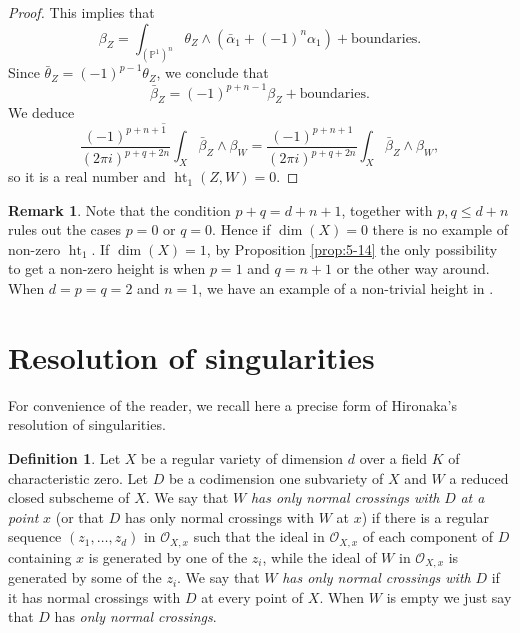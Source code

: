 \documentclass[11pt,a4paper]{amsart}
\renewcommand{\P}{\mathds{P}}
\newcommand{\caO}{\mathcal{O}}
\DeclareMathOperator{\Ht}{ht}
\numberwithin{equation}{section}
\theoremstyle{plain}
\theoremstyle{definition}
\newtheorem{df}[prop]{Definition}
\newtheorem{rmk}[prop]{Remark}
\begin{document}
\begin{proof}
This implies that 
\begin{displaymath}
  \beta_{Z}=\int_{ (\P^{1})^{n}}\theta _{Z}
  \wedge (\bar \alpha _{1}+(-1)^{n}\alpha _{1})+\text{boundaries}.
\end{displaymath}
Since $\bar \theta _{Z}=(-1)^{p-1}\theta _{Z}$, we conclude that
\begin{displaymath}
  \bar \beta _{Z}=(-1)^{p+n-1}\beta _{Z}+\text{boundaries}.
\end{displaymath}
 We deduce
\begin{displaymath}
  \overline {\frac{(-1)^{p+n+1}}{(2\pi i)^{p+q+2n}}
    \int_{X} \bar \beta _{Z}\wedge \beta _{W}}=
  \frac{(-1)^{p+n+1}}{(2\pi i)^{p+q+2n}}
    \int_{X} \bar \beta _{Z}\wedge \beta _{W},
  \end{displaymath}
  so it is a real number and $\Ht_{1}(Z,W)=0$.
\end{proof}

\begin{rmk}\label{rmk-ht-comp}
Note that the condition $p+q=d+n+1$, together with $p,q\le d+n$ rules out the cases
$p=0$ or $q=0$. Hence if $\dim(X)=0$ there is no example of non-zero
$\Ht_{1}$. If $\dim(X)=1$, by Proposition \ref{prop:5-14} the only possibility to get a non-zero height is when $p=1$ and $q=n+1$ or the other way around. When $d=p=q=2$ and $n=1$, we have an example of a non-trivial height in
\cite[\S 5.2-5.4]{BGGP:Height}.
\end{rmk}


\appendix
\section{Resolution of singularities}
\label{sec:resol-sing}

For convenience of the reader, we recall here a precise form of
Hironaka's resolution of singularities.

\begin{df}\label{def:6} Let $X$ be a regular variety of dimension $d$ over a field $K$ of
  characteristic zero.  Let $D$ be a codimension one subvariety  of $X$ and $W$ a
  reduced closed subscheme of $X$. We say that $W$ \emph{has only
    normal crossings with}
  $D$ \emph{at a point} $x$ (or that $D$ has only normal crossings
  with $W$ at $x$) if there is a regular sequence
  $(z_{1},\dots,z_{d})$ in $\caO_{X,x}$   such that the ideal in $\caO_{X,x}$ of each
  component of $D$ containing $x$ is generated by one of the $z_{i}$,
  while the ideal of $W$ in $\caO_{X,x}$ is generated by some of the
  $z_{i}$. We say that $W$ \emph{has only normal crossings with} $D$
  if it has normal crossings with $D$ at every point of $X$. When $W$
  is empty we just say that $D$ has \emph{only normal crossings}.
\end{df}
\end{document}
